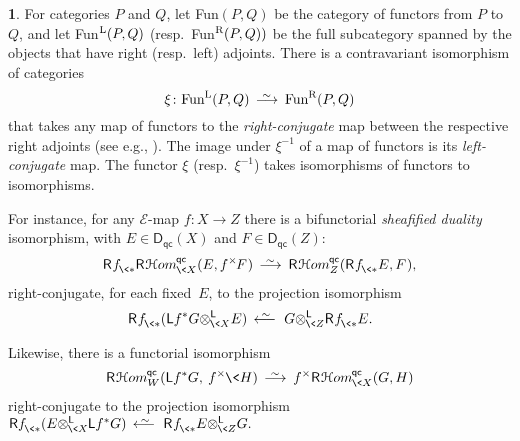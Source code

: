 \documentclass{compositio}
\theoremstyle{plain}
\theoremstyle{definition}
\newtheorem{cosa}[thm]{}
\theoremstyle{remark}
\numberwithin{equation}{thm}
\begin{document}
\begin{cosa}\label{conjugate} For categories $P$ and $Q$, let Fun$(P,Q)$ be the category of functors from $P$ to $Q$, and let Fun$^\textup{L}(P,Q)$ 
(resp.~Fun$^\textup{R}(P,Q))$ be the full subcategory spanned by the objects  that have right (resp.~left) adjoints. There is a contravariant isomorphism of categories
\[
\xi\colon\textup{Fun}^\textup{L}(P,Q){{\mkern8mu\longrightarrow \mkern-25.5mu{}^\sim\mkern17mu}}\textup{Fun}^\textup{R}(P,Q)
\]
that takes any map of functors to the \emph{right-conjugate} map between the respective
right adjoints (see e.g., \cite[3.3.5--3.3.7{\kern.5pt}]{li}). The image under $\xi^{-1}$ of a map
of functors is its \emph{left-conjugate} map. The functor $\xi$ (resp.~$\xi^{-1}$)  takes isomorphisms of functors to isomorphisms.

For instance, for any ${\mathscr{E}}$-map $f\colon X\to Z$ there is a bifunctorial \emph {sheafified duality}
isomorphism, with $E\in{{\boldsymbol{\mathsf{D}}}_{\mathsf{qc}}}(X)$ and $ F\in{{\boldsymbol{\mathsf{D}}}_{\mathsf{qc}}}(Z)$:
\begin{equation}\label{sheaf dual}
{\mathsf R}{\mkern1mu}{{f^{}_{{\mkern-1mu}\<*}}}{{\mathsf R}{\mkern1mu}{{\mathcal H} om}_{{{\mkern-1mu}\<X}}^{{\mkern-1mu}{\mathsf{qc}}}}(E, f^\times{\mkern-1mu}{\mkern-1mu} F{\mkern1mu}){{\mkern8mu\longrightarrow \mkern-25.5mu{}^\sim\mkern17mu}} {{\mathsf R}{\mkern1mu}{{\mathcal H} om}_{{Z}}^{{\mkern-1mu}{\mathsf{qc}}}}({\mathsf R}{\mkern1mu}{{f^{}_{{\mkern-1mu}\<*}}} E,F{\mkern1mu}),
\end{equation}
right-conjugate, for each fixed~$E$,  to the projection isomorphism 
\[
\mkern-24mu {\mathsf R}{\mkern1mu}{{f^{}_{{\mkern-1mu}\<*}}}({\mathsf L} f^*G{\otimes^{\mathsf L}_{{{\mkern-1mu}\<X}}} E){{\mkern8mu\longleftarrow \mkern-23.5mu{}^\sim\mkern17mu}} G{\otimes^{\mathsf L}_{{{\mkern-1mu}\<Z}}}{\mathsf R}{\mkern1mu}{{f^{}_{{\mkern-1mu}\<*}}} E.
\]

Likewise, there is a functorial isomorphism 
\begin{equation}\label{^timesHom}
{{\mathsf R}{\mkern1mu}{{\mathcal H} om}_{{W}}^{{\mkern-1mu}{\mathsf{qc}}}}({\mathsf L} f^*G, \>f^\times{\mkern-1mu}\<H){{\mkern8mu\longrightarrow \mkern-25.5mu{}^\sim\mkern17mu}} f^\times {{\mathsf R}{\mkern1mu}{{\mathcal H} om}_{{{\mkern-1mu}\<X}}^{{\mkern-1mu}{\mathsf{qc}}}}(G, H)
\end{equation}
right-conjugate  to the  projection isomorphism 
${\mathsf R} {{f^{}_{{\mkern-1mu}\<*}}}(E{\otimes^{\mathsf L}_{{{\mkern-1mu}\<X}}} {\mkern-1mu}{\mathsf L} f^*G){{\mkern8mu\longleftarrow \mkern-23.5mu{}^\sim\mkern17mu}}{\mathsf R}{\mkern1mu}{{f^{}_{{\mkern-1mu}\<*}}} E{\otimes^{\mathsf L}_{{{\mkern-1mu}\<Z}}} G.$ 

\end{cosa}
\end{document}
